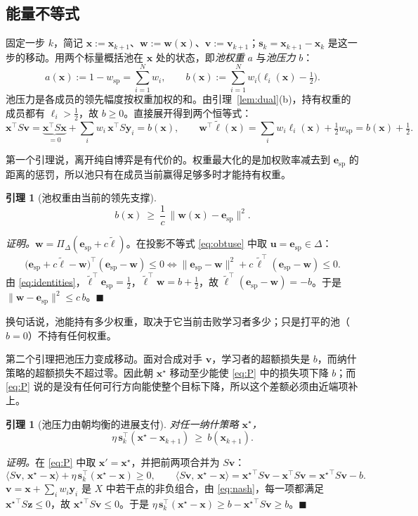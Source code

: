 \documentclass{article}
\theoremstyle{plain}
\newtheorem{lemma}[theorem]{引理}
\theoremstyle{remark}
\newcommand{\Proj}{\Pi}
\newcommand{\simplex}{\Delta}
\newcommand{\bx}{{\bm{x}}}
\newcommand{\by}{{\bm{y}}}
\newcommand{\bv}{{\bm{v}}}
\newcommand{\bw}{{\bm{w}}}
\newcommand{\bz}{{\bm{z}}}
\newcommand{\bu}{{\bm{u}}}
\newcommand{\be}{{\bm{e}}}
\newcommand{\bell}{{\bm{\ell}}}
\newcommand{\aug}{\tilde{\bell}}
\newcommand{\xs}{\bx^{\star}}
\newcommand{\dx}{{\bm{s}}}
\newcommand{\esp}{\be_{\mathrm{sp}}}
\newcommand{\wsp}{w_{\mathrm{sp}}}
\begin{document}
\subsection{能量不等式}
\label{sec:energy}

固定一步 $k$，简记 $\bx:=\bx_{k+1}$、$\bw:=\bw(\bx)$、$\bv:=\bv_{k+1}$；$\dx_k=\bx_{k+1}-\bx_k$ 是这一步的移动。用两个标量概括池在 $\bx$ 处的状态，即\emph{池权重} $a$ 与\emph{池压力} $b$：
\[
a(\bx):=1-\wsp=\sum_{i=1}^Nw_i,\qquad
b(\bx):=\sum_{i=1}^Nw_i\big(\ell_i(\bx)-\tfrac12\big).
\]
池压力是各成员的领先幅度按权重加权的和。由引理~\ref{lem:dual}(b)，持有权重的成员都有 $\ell_i>\tfrac12$，故 $b\ge0$。直接展开得到两个恒等式：
\begin{equation}
\bx^\top S\bv=\underbrace{\bx^\top S\bx}_{=0}+\textstyle\sum_iw_i\,\bx^\top S\by_i=b(\bx),\qquad
\bw^\top\aug(\bx)=\textstyle\sum_iw_i\ell_i(\bx)+\tfrac12\wsp=b(\bx)+\tfrac12 .
\label{eq:identities}
\end{equation}

第一个引理说，离开纯自博弈是有代价的。权重最大化的是加权败率减去到 $\esp$ 的距离的惩罚，所以池只有在成员当前赢得足够多时才能持有权重。

\begin{lemma}[池权重由当前的领先支撑]
\label{lem:A}
\[
b(\bx)\ \ge\ \frac1c\,\|\bw(\bx)-\esp\|^2 .
\]
\end{lemma}
\textit{证明。}$\bw=\Proj_\simplex(\esp+c\aug)$。在投影不等式 \eqref{eq:obtuse} 中取 $\bu=\esp\in\simplex$：
\[
\big(\esp+c\aug-\bw\big)^\top(\esp-\bw)\le0
\iff\|\esp-\bw\|^2+c\,\aug^\top(\esp-\bw)\le0 .
\]
由 \eqref{eq:identities}，$\aug^\top \esp=\tfrac12$，$\aug^\top \bw=b+\tfrac12$，故 $\aug^\top(\esp-\bw)=-b$。于是 $\|\bw-\esp\|^2\le c\,b$。\hfill$\blacksquare$

换句话说，池能持有多少权重，取决于它当前击败学习者多少；只是打平的池（$b=0$）不持有任何权重。

第二个引理把池压力变成移动。面对合成对手 $\bv$，学习者的超额损失是 $b$，而纳什策略的超额损失不超过零。因此朝 $\xs$ 移动至少能使 \eqref{eq:P} 中的损失项下降 $b$；而 \eqref{eq:P} 说的是没有任何可行方向能使整个目标下降，所以这个差额必须由近端项补上。

\begin{lemma}[池压力由朝均衡的进展支付]
\label{lem:B}
对任一纳什策略 $\xs$，
\[
\eta\,\dx_k^\top(\xs-\bx_{k+1})\ \ge\ b(\bx_{k+1}).
\]
\end{lemma}
\textit{证明。}在 \eqref{eq:P} 中取 $\bx'=\xs$，并把前两项合并为 $S\bv$：
\[
\langle S\bv,\,\xs-\bx\rangle+\eta\,\dx_k^\top(\xs-\bx)\ge0,\qquad
\langle S\bv,\,\xs-\bx\rangle={\xs}^\top S\bv-\bx^\top S\bv={\xs}^\top S\bv-b .
\]
$\bv=\bx+\sum_iw_i\by_i$ 是 $X$ 中若干点的非负组合，由 \eqref{eq:nash}，每一项都满足 ${\xs}^\top S\bz\le0$，故 ${\xs}^\top S\bv\le0$。于是 $\eta\,\dx_k^\top(\xs-\bx)\ge b-{\xs}^\top S\bv\ge b$。\hfill$\blacksquare$
\end{document}
